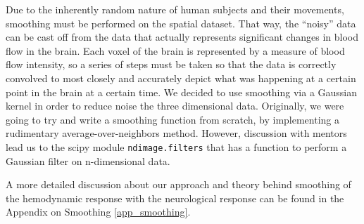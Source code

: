 \par \indent Due to the inherently random nature of human subjects and their 
movements, smoothing must be performed on the spatial dataset. That way, the 
``noisy'' data can be cast off from the data that actually represents 
significant changes in blood flow in the brain. Each voxel of the brain is 
represented by a measure of blood flow intensity, so a series of steps must 
be taken so that the data is correctly convolved to most closely and 
accurately depict what was happening at a certain point in the brain at a 
certain time. We decided to use smoothing via a Gaussian kernel in order to 
reduce noise the three dimensional data. Originally, we were going to try and 
write a smoothing function from scratch, by implementing a rudimentary 
average-over-neighbors method. However, discussion with mentors lead us to the 
scipy module \texttt{ndimage.filters} that has a function to perform a
Gaussian filter on n-dimensional data. 

\par \indent A more detailed discussion about our approach and theory behind 
smoothing of the hemodynamic response with the neurological response can be
found in the Appendix on Smoothing \ref{app_smoothing}.

